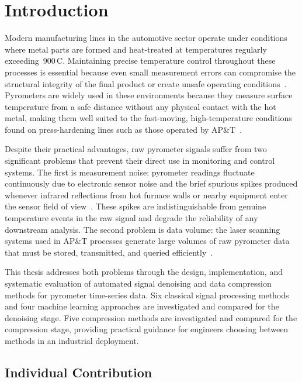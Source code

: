 \chapter{Introduction}

Modern manufacturing lines in the automotive sector operate under conditions where metal parts are formed and heat-treated at temperatures regularly exceeding~900\,\textdegree C. Maintaining precise temperature control throughout these processes is essential because even small measurement errors can compromise the structural integrity of the final product or create unsafe operating conditions~\cite{zhang2023physics}. Pyrometers are widely used in these environments because they measure surface temperature from a safe distance without any physical contact with the hot metal, making them well suited to the fast-moving, high-temperature conditions found on press-hardening lines such as those operated by AP\&T~\cite{optical_pyrometer_validation}.

Despite their practical advantages, raw pyrometer signals suffer from two significant problems that prevent their direct use in monitoring and control systems. The first is measurement noise: pyrometer readings fluctuate continuously due to electronic sensor noise and the brief spurious spikes produced whenever infrared reflections from hot furnace walls or nearby equipment enter the sensor field of view~\cite{kalman_wavelet_denoising}. These spikes are indistinguishable from genuine temperature events in the raw signal and degrade the reliability of any downstream analysis. The second problem is data volume: the laser scanning systems used in AP\&T processes generate large volumes of raw pyrometer data that must be stored, transmitted, and queried efficiently~\cite{lossless_compression, autoencoder_compression}.

This thesis addresses both problems through the design, implementation, and systematic evaluation of automated signal denoising and data compression methods for pyrometer time-series data. Six classical signal processing methods and four machine learning approaches are investigated and compared for the denoising stage. Five compression methods are investigated and compared for the compression stage, providing practical guidance for engineers choosing between methods in an industrial deployment.

\section{Individual Contribution}
\label{sec:individual_contribution}


